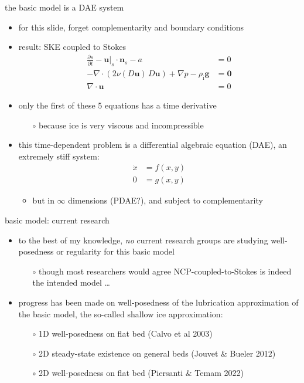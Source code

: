 \documentclass[svgnames,
               hyperref={colorlinks,citecolor=DeepPink4,linkcolor=FireBrick,urlcolor=Maroon},
               usepdftitle=false]  %
               {beamer}
\newcommand{\bn}{\mathbf{n}}
\newcommand{\bu}{\mathbf{u}}
\newcommand{\bzero}{\bm{0}}
\newcommand{\rhoi}{\rho_{\text{i}}}
\begin{document}
\begin{frame}{the basic model is a DAE system}

\begin{itemize}
\item for this slide, forget complementarity and boundary conditions
\item result: SKE coupled to Stokes
\begin{align*}
\frac{\partial s}{\partial t} - \bu|_s \cdot \bn_s - a &= 0 \\
- \nabla \cdot \left(2 \nu(D\bu)\, D\bu\right) + \nabla p - \rhoi \mathbf{g} &= \bzero \\
\nabla \cdot \bu &= 0
\end{align*}

\item only the first of these 5 equations has a time derivative
    \begin{itemize}
    \item[$\circ$] because ice is very viscous and incompressible
    \end{itemize}
\item<2> this time-dependent problem is a \alert{differential algebraic equation} (DAE), an extremely stiff system:
\begin{align*}
\dot x &= f(x,y) \\
     0 &= g(x,y)
\end{align*}

    \begin{itemize}
    \item<2>[$\circ$] but in $\infty$ dimensions (PDAE?), and subject to complementarity
    \end{itemize}
\end{itemize}
\end{frame}


\begin{frame}{basic model: current research}

\begin{itemize}
\item to the best of my knowledge, \emph{no} current research groups are studying well-posedness or regularity for this basic model
    \begin{itemize}
    \item[$\circ$] though most researchers would agree NCP-coupled-to-Stokes is indeed the intended model \dots
    \end{itemize}
\item progress has been made on well-posedness of the lubrication approximation of the basic model, the so-called \alert{shallow ice approximation}:
    \begin{itemize}
    \item[$\circ$] 1D well-posedness on flat bed (Calvo et al 2003)
    \item[$\circ$] 2D steady-state existence on general beds (Jouvet \& Bueler 2012)
    \item[$\circ$] 2D well-posedness on flat bed (Piersanti \& Temam 2022)
    \end{itemize}
\end{itemize}
\end{frame}
\end{document}
